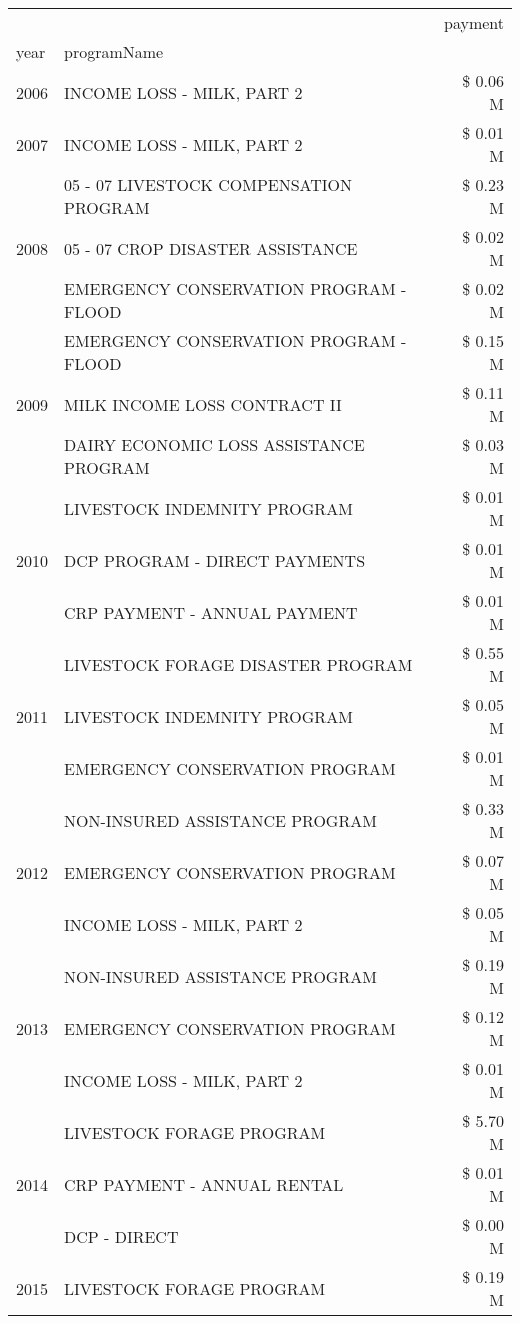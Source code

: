 \begin{tabular}{llr}
\toprule
 &  & payment \\
year & programName &  \\
\midrule
2006 & INCOME LOSS - MILK, PART 2 & \$ 0.06 M \\
\cline{1-3}
2007 & INCOME LOSS - MILK, PART 2 & \$ 0.01 M \\
\cline{1-3}
\multirow[t]{3}{*}{2008} & 05 - 07 LIVESTOCK COMPENSATION PROGRAM & \$ 0.23 M \\
 & 05 - 07 CROP DISASTER ASSISTANCE & \$ 0.02 M \\
 & EMERGENCY CONSERVATION PROGRAM - FLOOD & \$ 0.02 M \\
\cline{1-3}
\multirow[t]{3}{*}{2009} & EMERGENCY CONSERVATION PROGRAM - FLOOD & \$ 0.15 M \\
 & MILK INCOME LOSS CONTRACT II & \$ 0.11 M \\
 & DAIRY ECONOMIC LOSS ASSISTANCE PROGRAM & \$ 0.03 M \\
\cline{1-3}
\multirow[t]{3}{*}{2010} & LIVESTOCK INDEMNITY PROGRAM & \$ 0.01 M \\
 & DCP PROGRAM - DIRECT PAYMENTS & \$ 0.01 M \\
 & CRP PAYMENT - ANNUAL PAYMENT & \$ 0.01 M \\
\cline{1-3}
\multirow[t]{3}{*}{2011} & LIVESTOCK FORAGE DISASTER PROGRAM & \$ 0.55 M \\
 & LIVESTOCK INDEMNITY PROGRAM & \$ 0.05 M \\
 & EMERGENCY CONSERVATION PROGRAM & \$ 0.01 M \\
\cline{1-3}
\multirow[t]{3}{*}{2012} & NON-INSURED ASSISTANCE PROGRAM & \$ 0.33 M \\
 & EMERGENCY CONSERVATION PROGRAM & \$ 0.07 M \\
 & INCOME LOSS - MILK, PART 2 & \$ 0.05 M \\
\cline{1-3}
\multirow[t]{3}{*}{2013} & NON-INSURED ASSISTANCE PROGRAM & \$ 0.19 M \\
 & EMERGENCY CONSERVATION PROGRAM & \$ 0.12 M \\
 & INCOME LOSS - MILK, PART 2 & \$ 0.01 M \\
\cline{1-3}
\multirow[t]{3}{*}{2014} & LIVESTOCK FORAGE PROGRAM & \$ 5.70 M \\
 & CRP PAYMENT - ANNUAL RENTAL & \$ 0.01 M \\
 & DCP - DIRECT & \$ 0.00 M \\
\cline{1-3}
\multirow[t]{3}{*}{2015} & LIVESTOCK FORAGE PROGRAM & \$ 0.19 M \\

\end{tabular}
